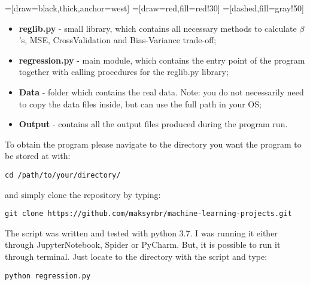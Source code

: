 =[draw=black,thick,anchor=west]
=[draw=red,fill=red!30]
=[dashed,fill=gray!50]
\begin{center}
\end{center}
\begin{itemize}
    \item \textbf{reglib.py} - small library, which contains all necessary methods to calculate $\beta$'s, MSE, CrossValidation and Bias-Variance trade-off;
    \item \textbf{regression.py}  - main module, which contains the entry point of the program together with calling procedures for the reglib.py library;
    \item \textbf{Data} - folder which contains the real data. Note: you do not necessarily need to copy the data files inside, but can use the full path in your OS;
    \item \textbf{Output} - contains all the output files produced during the program run.
\end{itemize}

To obtain the program please navigate to the directory you want the program to be stored at with:
\begin{lstlisting}
cd /path/to/your/directory/
\end{lstlisting}
and simply clone the repository by typing:
\begin{lstlisting}
git clone https://github.com/maksymbr/machine-learning-projects.git
\end{lstlisting}

The script was written and tested with python 3.7. I was running it either through JupyterNotebook, Spider or PyCharm. But, it is possible to run it through terminal. Just locate to the directory with the script and type:
\begin{lstlisting}
python regression.py
\end{lstlisting}

